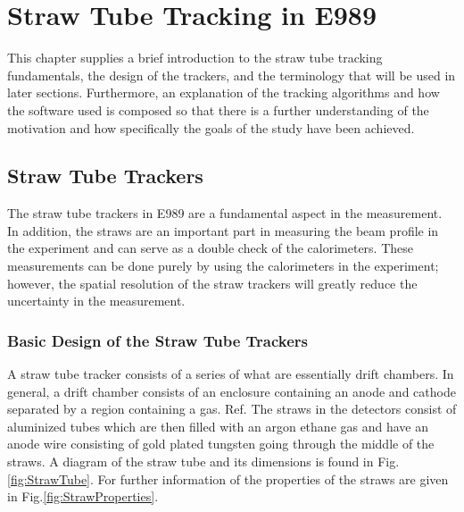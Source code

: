 \documentclass[./Thesis]{subfiles}
\begin{document}
\chapter{Straw Tube Tracking in E989}

This chapter supplies a brief introduction to the straw tube tracking fundamentals, the design of the trackers, and the terminology that will be used in later sections. Furthermore, an explanation of the tracking algorithms and how the software used is composed so that there is a further understanding of the motivation and how specifically the goals of the study have been achieved.

\section{Straw Tube Trackers}

The straw tube trackers in E989 are a fundamental aspect in the measurement.  In addition, the straws are an important part in measuring the beam profile in the experiment and can serve as a double check of the calorimeters.  These measurements can be done purely by using the calorimeters in the experiment; however, the spatial resolution of the straw trackers will greatly reduce the uncertainty in the measurement.

\subsection{Basic Design of the Straw Tube Trackers}

	A straw tube tracker consists of a series of what are essentially drift chambers.  In general, a drift chamber consists of an enclosure containing an anode and cathode separated by a region containing a gas.  Ref.\cite{driftchambers} The straws in the detectors consist of aluminized tubes which are then filled with an argon ethane gas and have an anode wire consisting of gold plated tungsten going through the middle of the straws.  A diagram of the straw tube and its dimensions is found in Fig.\ref{fig:StrawTube}.  For further information of the properties of the straws are given in Fig.\ref{fig:StrawProperties}.
 
\end{document}
